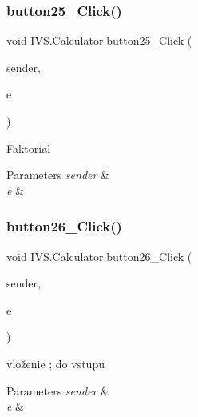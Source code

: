 \subsubsection{\texorpdfstring{button25\+\_\+\+Click()}{button25\_Click()}}
{\footnotesize\ttfamily void I\+V\+S.\+Calculator.\+button25\+\_\+\+Click (\begin{DoxyParamCaption}\item[{object}]{sender,  }\item[{Event\+Args}]{e }\end{DoxyParamCaption})\hspace{0.3cm}{\ttfamily [protected]}}



Faktorial 


\begin{DoxyParams}{Parameters}
{\em sender} & \\
\hline
{\em e} & \\
\hline
\end{DoxyParams}
\mbox{\label{class_i_v_s_1_1_calculator_a50b09cd75e77f655a9e082b8df2ad4c5}} 
\subsubsection{\texorpdfstring{button26\+\_\+\+Click()}{button26\_Click()}}
{\footnotesize\ttfamily void I\+V\+S.\+Calculator.\+button26\+\_\+\+Click (\begin{DoxyParamCaption}\item[{object}]{sender,  }\item[{Event\+Args}]{e }\end{DoxyParamCaption})\hspace{0.3cm}{\ttfamily [protected]}}



vloženie \textquotesingle{};\textquotesingle{} do vstupu 


\begin{DoxyParams}{Parameters}
{\em sender} & \\
\hline
{\em e} & \\
\hline
\end{DoxyParams}
\mbox{\label{class_i_v_s_1_1_calculator_aa6a17fb7e856187dfd9b8964e67e2f57}} 

